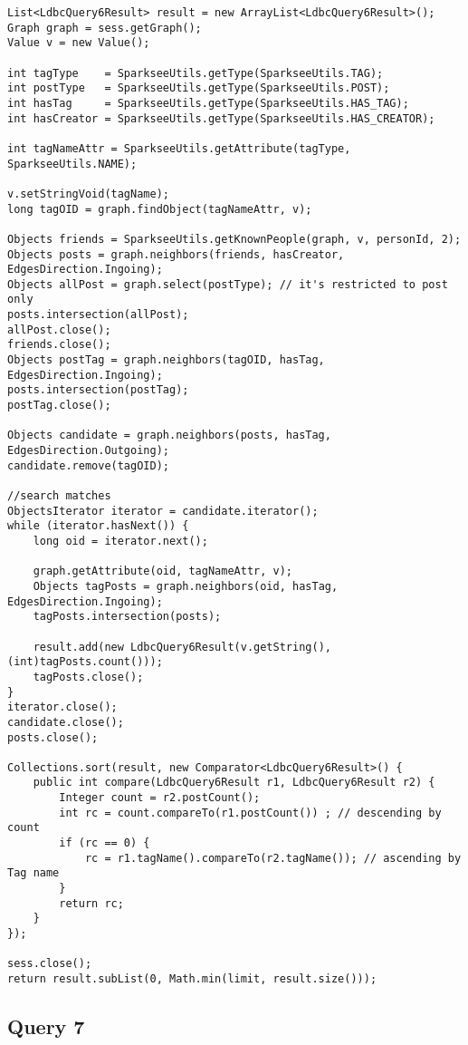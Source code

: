 {\footnotesize
\begin{verbatim}
List<LdbcQuery6Result> result = new ArrayList<LdbcQuery6Result>();
Graph graph = sess.getGraph();
Value v = new Value();

int tagType    = SparkseeUtils.getType(SparkseeUtils.TAG);
int postType   = SparkseeUtils.getType(SparkseeUtils.POST);
int hasTag     = SparkseeUtils.getType(SparkseeUtils.HAS_TAG);
int hasCreator = SparkseeUtils.getType(SparkseeUtils.HAS_CREATOR);

int tagNameAttr = SparkseeUtils.getAttribute(tagType, SparkseeUtils.NAME);

v.setStringVoid(tagName);
long tagOID = graph.findObject(tagNameAttr, v);

Objects friends = SparkseeUtils.getKnownPeople(graph, v, personId, 2);
Objects posts = graph.neighbors(friends, hasCreator, EdgesDirection.Ingoing);
Objects allPost = graph.select(postType); // it's restricted to post only
posts.intersection(allPost);
allPost.close();
friends.close();
Objects postTag = graph.neighbors(tagOID, hasTag, EdgesDirection.Ingoing);
posts.intersection(postTag);
postTag.close();

Objects candidate = graph.neighbors(posts, hasTag, EdgesDirection.Outgoing);
candidate.remove(tagOID);

//search matches
ObjectsIterator iterator = candidate.iterator();
while (iterator.hasNext()) {
    long oid = iterator.next();

    graph.getAttribute(oid, tagNameAttr, v);
    Objects tagPosts = graph.neighbors(oid, hasTag, EdgesDirection.Ingoing);
    tagPosts.intersection(posts);

    result.add(new LdbcQuery6Result(v.getString(), (int)tagPosts.count()));
    tagPosts.close();
}
iterator.close();
candidate.close();
posts.close();

Collections.sort(result, new Comparator<LdbcQuery6Result>() {
    public int compare(LdbcQuery6Result r1, LdbcQuery6Result r2) {
        Integer count = r2.postCount();
        int rc = count.compareTo(r1.postCount()) ; // descending by count
        if (rc == 0) {
            rc = r1.tagName().compareTo(r2.tagName()); // ascending by Tag name
        }
        return rc;
    }
});

sess.close();
return result.subList(0, Math.min(limit, result.size()));

\end{verbatim}
}

\subsection{Query 7}

